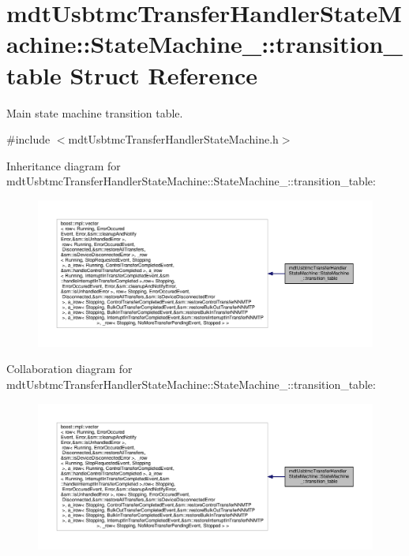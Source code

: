 \hypertarget{structmdt_usbtmc_transfer_handler_state_machine_1_1_state_machine___1_1transition__table}{\section{mdt\-Usbtmc\-Transfer\-Handler\-State\-Machine\-:\-:State\-Machine\-\_\-\-:\-:transition\-\_\-table Struct Reference}
\label{structmdt_usbtmc_transfer_handler_state_machine_1_1_state_machine___1_1transition__table}
}


Main state machine transition table.  




{\ttfamily \#include $<$mdt\-Usbtmc\-Transfer\-Handler\-State\-Machine.\-h$>$}



Inheritance diagram for mdt\-Usbtmc\-Transfer\-Handler\-State\-Machine\-:\-:State\-Machine\-\_\-\-:\-:transition\-\_\-table\-:
\nopagebreak
\begin{figure}[H]
\begin{center}
\leavevmode
\includegraphics[width=350pt]{structmdt_usbtmc_transfer_handler_state_machine_1_1_state_machine___1_1transition__table__inherit__graph}
\end{center}
\end{figure}


Collaboration diagram for mdt\-Usbtmc\-Transfer\-Handler\-State\-Machine\-:\-:State\-Machine\-\_\-\-:\-:transition\-\_\-table\-:
\nopagebreak
\begin{figure}[H]
\begin{center}
\leavevmode
\includegraphics[width=350pt]{structmdt_usbtmc_transfer_handler_state_machine_1_1_state_machine___1_1transition__table__coll__graph}
\end{center}
\end{figure}


